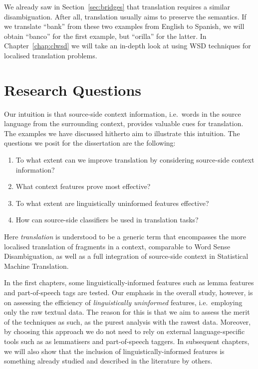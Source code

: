 We already saw in Section~\ref{sec:bridges} that translation requires a
similar disambiguation. After all, translation usually aims to preserve the
semantics. If we translate ``bank'' from these two examples from English to
Spanish, we will obtain ``banco'' for the first example, but ``orilla'' for the
latter. In Chapter~\ref{chap:clwsd} we will take an in-depth look at using
WSD techniques for localised translation problems.

\section{Research Questions}
\label{sec:overallresearchquestion}

Our intuition is that source-side context information, i.e.\ words in the
source language from the surrounding context, provides valuable cues for
translation. The examples we have discussed hitherto aim to illustrate this
intuition. The questions we posit for the dissertation are the following:

\begin{enumerate}
\item To what extent can we improve translation by considering source-side
    context information?
\item What context features prove most effective?
\item To what extent are linguistically uninformed features effective?
\item How can source-side classifiers be used in translation tasks?
\end{enumerate}

Here \emph{translation} is understood to be a generic term that
encompasses the more localised translation of fragments in a
context, comparable to Word Sense Disambiguation, as well as a full integration
of source-side context in Statistical Machine Translation.

In the first chapters, some linguistically-informed features such as lemma
features and part-of-speech tags are tested. Our emphasis in the overall study,
however, is on assessing the efficiency of \emph{linguistically uninformed}
features, i.e.\ employing only the raw textual data. The reason for this is that we
aim to assess the merit of the techniques as such, as the purest analysis with the rawest data. Moreover, by choosing this approach we do
not need to rely on external language-specific tools such as as lemmatisers and
part-of-speech taggers. In subsequent chapters, we will also show that the
inclusion of linguistically-informed features is something already studied and
described in the literature by others.

